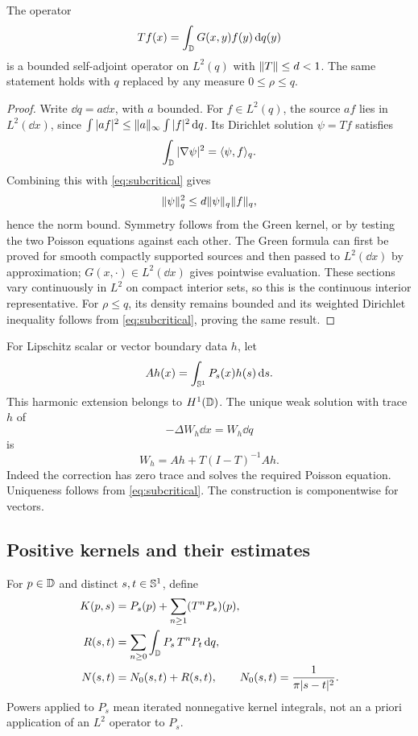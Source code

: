 \begin{lemma}\label{lem:green-operator}
The operator
\[
Tf(x)=\int_\mathbb D G(x,y)f(y)\,\mathrm d q(y)
\]
is a bounded self-adjoint operator on $L^2(q)$ with $\lVert T\rVert\le d<1$. The same statement holds with $q$ replaced by any measure $0\le\rho\le q$.
\end{lemma}
\begin{proof}
Write $\dd q=a\dd x$, with $a$ bounded. For $f\in L^2(q)$, the source $af$ lies in $L^2(\dd x)$, since $\int|af|^2\le\lVert a\rVert_\infty\int|f|^2\,\mathrm d q$. Its Dirichlet solution $\psi=Tf$ satisfies
\[
\int_\mathbb D|\nabla\psi|^2=\langle \psi,f\rangle_q.
\]
Combining this with \eqref{eq:subcritical} gives
\[
\lVert \psi\rVert_q^2\le d\lVert \psi\rVert_q\lVert f\rVert_q,
\]
hence the norm bound. Symmetry follows from the Green kernel, or by testing the two Poisson equations against each other. The Green formula can first be proved for smooth compactly supported sources and then passed to $L^2(\dd x)$ by approximation; $G(x,\cdot)\in L^2(\dd x)$ gives pointwise evaluation. These sections vary continuously in $L^2$ on compact interior sets, so this is the continuous interior representative. For $\rho\le q$, its density remains bounded and its weighted Dirichlet inequality follows from \eqref{eq:subcritical}, proving the same result.
\end{proof}

For Lipschitz scalar or vector boundary data $h$, let
\[
Ah(x)=\int_{\mathbb S^1}P_s(x)h(s)\,\mathrm d s.
\]
This harmonic extension belongs to $H^1(\mathbb D)$. The unique weak solution with trace $h$ of
\[
-\Delta W_h\dd x=W_h\dd q
\]
is
\begin{equation}\label{eq:extension}
W_h=Ah+T(I-T)^{-1}Ah.
\end{equation}
Indeed the correction has zero trace and solves the required Poisson equation. Uniqueness follows from \eqref{eq:subcritical}. The construction is componentwise for vectors.

\subsection{Positive kernels and their estimates}

For $p\in\mathbb D$ and distinct $s,t\in\mathbb S^1$, define
\begin{align}
K(p,s)&=P_s(p)+\sum_{n\ge1}(T^nP_s)(p),\label{eq:K}\\
R(s,t)&=\sum_{n\ge0}\int_\mathbb D P_s\,T^nP_t\,\mathrm d q,\label{eq:R}\\
N(s,t)&=N_0(s,t)+R(s,t),\qquad N_0(s,t)=\frac1{\pi|s-t|^2}.\label{eq:N}
\end{align}
Powers applied to $P_s$ mean iterated nonnegative kernel integrals, not an a priori application of an $L^2$ operator to $P_s$.

